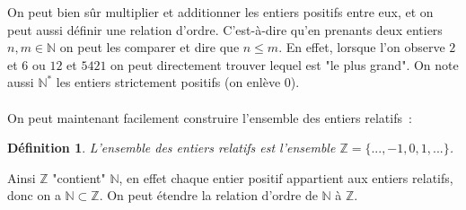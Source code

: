 \documentclass[a4paper, 12pt, french, twoside]{article}
\newtheorem{defi}[theorem]{Définition}
\newcommand{\Nn}{{\mathbb{N}}}
\newcommand{\Zz}{{\mathbb{Z}}}
\newcommand{\Rr}{{\mathbb{R}}}
\newcommand{\Qq}{{\mathbb{Q}}}
\begin{document}
On peut bien sûr multiplier et additionner les entiers positifs entre eux, et on peut aussi définir une relation d'ordre. C'est-à-dire qu'en prenants deux entiers $n,m\in \Nn$ on peut les comparer et dire que $n\leq m $. En effet, lorsque l'on observe $2$ et $6$ ou $12$ et $5421$ on peut directement trouver lequel est "le plus grand".
On note aussi $\Nn^*$ les entiers strictement positifs (on enlève 0).\\\\
On peut maintenant facilement construire l'ensemble des entiers relatifs : 
\begin{defi}
    L'ensemble des entiers relatifs est l'ensemble $\Zz=\{...,-1,0,1,...\}$.
\end{defi}
Ainsi $\Zz$ "contient" $\Nn$, en effet chaque entier positif appartient aux entiers relatifs, donc on a $\Nn \subset \Zz$. On peut étendre la relation d'ordre de $\Nn$ à $\Zz$.\\\\
\end{document}
